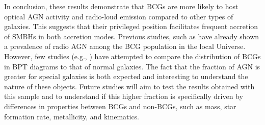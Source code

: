 In conclusion, these results demonstrate that BCGs are more likely to host optical AGN activity
and radio-loud emission compared to other types of galaxies.
This suggests that their privileged position facilitates frequent accretion of SMBHs in both
accretion modes. Previous studies, such as \cite{2016MNRAS.460.3669Y, 2014MNRAS.440..762O, 2007MNRAS.379..867V} 
have already shown a prevalence of radio AGN among the BCG
population in the local Universe. However, few studies (e.g., \cite{2019CoBAO..66..153F}) have attempted to
compare the distribution of BCGs in BPT diagrams to that of normal galaxies. The fact that the
fraction of AGN is greater for special galaxies is both expected and interesting to understand the
nature of these objects. Future studies will aim to test the results obtained with this sample and to
understand if this higher fraction is specifically driven by differences in properties between BCGs
and non-BCGs, such as mass, star formation rate, metallicity, and kinematics.

